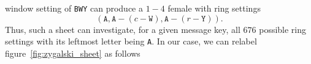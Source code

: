 window setting of \texttt{BWY} can produce a $1-4$ female with ring settings
\[
  (\texttt{A}, \texttt{A} - (c -\texttt{W}), \texttt{A} - (r -\texttt{Y})).
\]
Thus, such a sheet can investigate, for a given message key, all $676$
possible ring settings with its leftmost letter being \texttt{A}. In
our case, we can relabel figure~\ref{fig:zygalski_sheet} as follows
\begin{figure}[H]
  \begin{center}
\end{center}
\end{figure}
